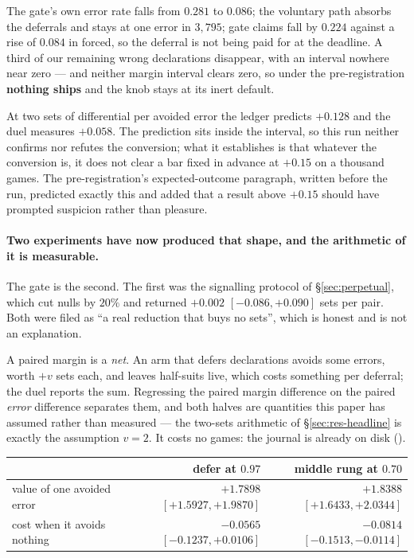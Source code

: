 \documentclass[11pt,a4paper]{article}
\begin{document}
\noindent The gate's own error rate falls from $0.281$ to $0.086$; the
voluntary path absorbs the deferrals and stays at one error in $3{,}795$; gate
claims fall by $0.224$ against a rise of $0.084$ in forced, so the deferral is
not being paid for at the deadline. A third of our remaining wrong
declarations disappear, with an interval nowhere near zero --- and neither
margin interval clears zero, so under the pre-registration \textbf{nothing
ships} and the knob stays at its inert default.

At two sets of differential per avoided error the ledger predicts $+0.128$ and
the duel measures $+0.058$. The prediction sits inside the interval, so this
run neither confirms nor refutes the conversion; what it establishes is that
whatever the conversion is, it does not clear a bar fixed in advance at
$+0.15$ on a thousand games. The pre-registration's expected-outcome
paragraph, written before the run, predicted exactly this and added that a
result above $+0.15$ should have prompted suspicion rather than pleasure.

\paragraph{Two experiments have now produced that shape, and the arithmetic of
it is measurable.} The gate is the second. The first was the signalling
protocol of \S\ref{sec:perpetual}, which cut nulls by $20\%$ and returned
$+0.002$ $[-0.086, +0.090]$ sets per pair. Both were filed as ``a real
reduction that buys no sets'', which is honest and is not an explanation.

A paired margin is a \emph{net}. An arm that defers declarations avoids some
errors, worth $+v$ sets each, and leaves half-suits live, which costs
something per deferral; the duel reports the sum. Regressing the paired margin
difference on the paired \emph{error} difference separates them, and both
halves are quantities this paper has assumed rather than measured --- the
two-sets arithmetic of \S\ref{sec:res-headline} is exactly the assumption $v =
2$. It costs no games: the journal is already on disk
().

\begin{center}
\small
\begin{tabular}{lrr}
\toprule
& defer at $0.97$ & middle rung at $0.70$ \\
\midrule
value of one avoided error & $+1.7898$ $[+1.5927, +1.9870]$ & $+1.8388$ $[+1.6433, +2.0344]$ \\
cost when it avoids nothing & $-0.0565$ $[-0.1237, +0.0106]$ & $-0.0814$ $[-0.1513, -0.0114]$ \\
\bottomrule
\end{tabular}
\end{center}
\end{document}
